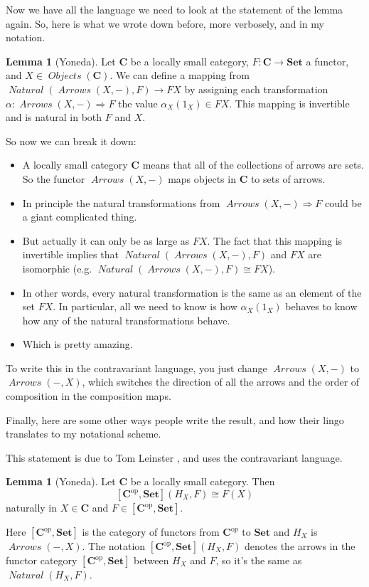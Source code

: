 \documentclass[12pt]{article}
\theoremstyle{definition}
\newtheorem{lemma}[thm]{Lemma}
\theoremstyle{definition}
\theoremstyle{definition}
\numberwithin{equation}{section}
\newcommand{\h}{H}                      %
\newcommand{\op}{\mathrm{op}}           %
\newcommand{\ftrcat}[2]{[#1,#2]}                %
\newcommand{\pshf}[1]{\ftrcat{#1^\op}{\Set}}    %
\newcommand{\cat}[1]{\mathbf{#1}}      %
\newcommand{\fcat}[1]{{\mathbf {#1}}}    %
\newcommand{\CC}{\cat{C}}
\newcommand{\CCop}{\cat{C}^{\mathrm op}}
\DeclareMathOperator{\Arrows}{\mathit{Arrows}}
\DeclareMathOperator{\Objects}{\mathit{Objects}}
\DeclareMathOperator{\Nat}{\mathit{Natural}}
\def\objc{\Objects(\cat{C})}
\newcommand{\Set}{\fcat{Set}}           %
\newcommand{\iso}{\cong}                %
\newcommand{\fto}{\Rightarrow}
\def\pg{\bigskip\goodbreak
\ni}
\def\ni{\goodbreak\noindent}
\begin{document}
Now we have all the language we need to look at the statement of the lemma again.
So, here is what we wrote down before, more verbosely, and in my notation.

\begin{lemma}[Yoneda]\label{yoneda} Let $\CC$ be a locally small category, $F:\CC \to \Set$ a functor,
and $X \in \objc$. We can define a mapping from $\Nat(\Arrows(X, -),F) \to FX$
by assigning each transformation $\alpha: \Arrows(X, -) \fto F$ 
the value $\alpha_X(1_X) \in FX$. 
This mapping is invertible and is natural in both $F$ and $X$.
\end{lemma}
\ni
So now we can break it down:
\begin{itemize}
\item A locally small category $\CC$ means that all of the collections of arrows are sets.
So the functor $\Arrows(X,-)$ maps objects in $\CC$ to sets of arrows.
\item In principle the natural transformations 
from $\Arrows(X, -) \fto F$ could be a giant complicated thing.
\item But actually it can only be as large as $FX$. The fact that this mapping is
invertible implies
that $\Nat(\Arrows(X, -),F)$ and  $FX$ are isomorphic (e.g. $\Nat(\Arrows(X, -),F) \iso FX$).
\item In other words, every natural transformation is the same as
an element of the set $FX$. In particular, all we need to know is how 
$\alpha_X(1_X)$ behaves to know
how any of the natural transformations behave.
\item Which is pretty amazing.
\end{itemize}
To write this in the contravariant language, you just change $\Arrows(X, -)$ to $\Arrows(-, X)$, which
switches the direction of all the arrows and the order of composition in the composition maps.

\pg
Finally, here are some other ways people write the result, and how their lingo translates to 
my notational scheme.

\pg
This statement is due to Tom Leinster \cite{Leinster}, and uses the contravariant language.

\begin{lemma}[Yoneda]   
\label{yoneda-leinster}
Let $\CC$ be a locally small category.  Then
%
$$
\pshf{\CC}(\h_X, F)
\iso
F(X)
$$
%
naturally in $X \in \CC$ and $F \in \pshf{\CC}$.  
\end{lemma}
\ni
Here $[\CCop, \Set]$ is the category of functors from $\CCop$ to $\Set$ and $\h_X$ is $\Arrows(-,X)$.
The notation $\pshf{\CC}(\h_X, F)$ denotes the arrows in the functor category $\pshf{\CC}$ between 
$\h_X$ and $F$, so it's the same as $\Nat(\h_X, F)$.
\end{document}
